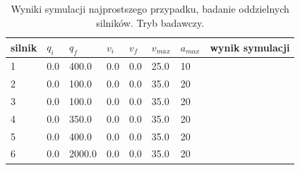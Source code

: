 \documentclass[a4paper, 12pt]{article}
\begin{document}
	\begin{table}[H]
	\centering
	\begin{tabular}{|m{2.5em}|m{4em}|m{4em}|m{4em}|m{4em}|m{4em}|m{4em}|m{5em}|}
	\hline
	silnik&$ q_i $ & $ q_f $ & $ v_i $ & $ v_f $ & $ v_{max} $ & $ a_{max} $&wynik symulacji\\
	\hline
	\hline
	\hspace{1em}1& 0.0 & 400.0 & 0.0 & 0.0 & 25.0 & 10&\hspace{2em}\checkmark\\ %
	\hline
	\hspace{1em}2& 0.0 & 100.0 & 0.0 & 0.0 & 35.0 & 20&\hspace{2em}\checkmark\\  %
	\hline
	\hspace{1em}3& 0.0 & 100.0 & 0.0 & 0.0 & 35.0 & 20&\hspace{2em}\checkmark\\ %
	\hline
	\hspace{1em}4& 0.0 & 350.0 & 0.0 & 0.0 & 35.0 & 20&\hspace{2em}\checkmark\\  %
	\hline
	\hspace{1em}5& 0.0 & 400.0 & 0.0 & 0.0 & 35.0 & 20&\hspace{2em}\checkmark\\  %
	\hline
	\hspace{1em}6& 0.0 & 2000.0 & 0.0 & 0.0 & 35.0 & 20&\hspace{2em}\checkmark\\  %
	\hline
	\end{tabular}
	\caption{Wyniki symulacji najprostszego przypadku, badanie oddzielnych silników. Tryb badawczy.}
	\label{tab:setup3}
	\end{table}
	
\end{document}
